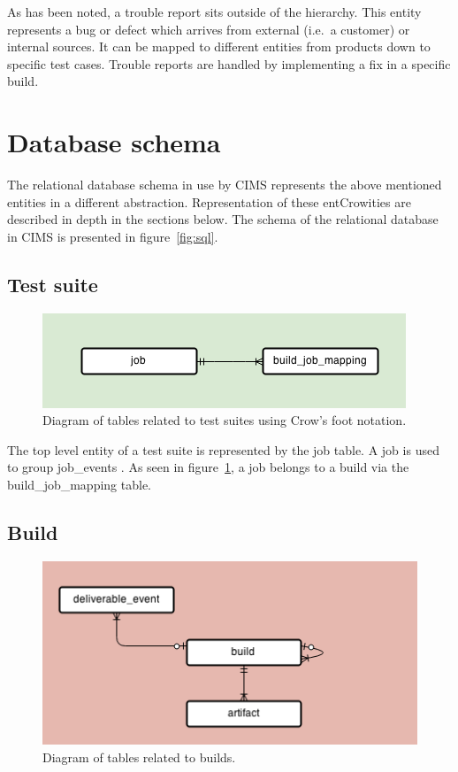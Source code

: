 As has been noted, a trouble report sits outside of the hierarchy. This entity represents a bug or defect which arrives from external (i.e.\ a customer) or internal sources. It can be mapped to different entities from products down to specific test cases. Trouble reports are handled by implementing a fix in a specific build.

\section{Database schema}
The relational database schema in use by CIMS represents the above mentioned entities in a different abstraction. Representation of these entCrowities are described in depth in the sections below.
The schema of the relational database in CIMS is presented in figure~\ref{fig:sql}.

\subsection{Test suite}
\begin{figure}[h!]
\centering
\includegraphics[scale=0.5]{figure/job.png}
\caption{Diagram of tables related to test suites using Crow's foot notation.}
\label{fig:job}
\end{figure}
The top level entity of a test suite is represented by the job table. A job is used to group job\_events   . As seen in figure~\ref{fig:job}, a job belongs to a build via the build\_job\_mapping table.   
\subsection{Build}
\begin{figure}[h!]
\centering
\includegraphics[scale=0.5]{figure/build.png}
\caption{Diagram of tables related to builds.}
\label{fig:build}
\end{figure}
